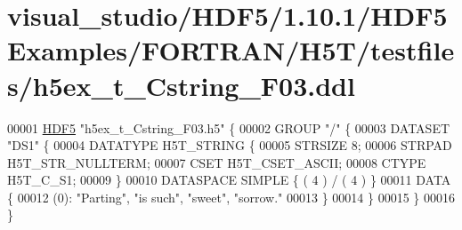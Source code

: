 \hypertarget{visual__studio_2_h_d_f5_21_810_81_2_h_d_f5_examples_2_f_o_r_t_r_a_n_2_h5_t_2testfiles_2h5ex__t___cstring___f03_8ddl_source}{}\section{visual\+\_\+studio/\+H\+D\+F5/1.10.1/\+H\+D\+F5\+Examples/\+F\+O\+R\+T\+R\+A\+N/\+H5\+T/testfiles/h5ex\+\_\+t\+\_\+\+Cstring\+\_\+\+F03.ddl}
\label{visual__studio_2_h_d_f5_21_810_81_2_h_d_f5_examples_2_f_o_r_t_r_a_n_2_h5_t_2testfiles_2h5ex__t___cstring___f03_8ddl_source}

\begin{DoxyCode}
00001 \hyperlink{namespace_h_d_f5}{HDF5} \textcolor{stringliteral}{"h5ex\_t\_Cstring\_F03.h5"} \{
00002 GROUP \textcolor{stringliteral}{"/"} \{
00003    DATASET \textcolor{stringliteral}{"DS1"} \{
00004       DATATYPE  H5T\_STRING \{
00005          STRSIZE 8;
00006          STRPAD H5T\_STR\_NULLTERM;
00007          CSET H5T\_CSET\_ASCII;
00008          CTYPE H5T\_C\_S1;
00009       \}
00010       DATASPACE  SIMPLE \{ ( 4 ) / ( 4 ) \}
00011       DATA \{
00012       (0): \textcolor{stringliteral}{"Parting"}, \textcolor{stringliteral}{"is such"}, \textcolor{stringliteral}{"sweet"}, \textcolor{stringliteral}{"sorrow."}
00013       \}
00014    \}
00015 \}
00016 \}
\end{DoxyCode}
